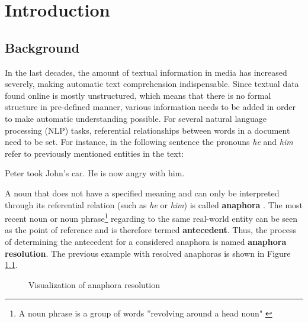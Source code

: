 \chapter{Introduction}
\label{sec:Introduction}

\section{Background}

In the last decades, the amount of textual information in media has increased severely, making automatic text comprehension indispensable. Since textual data found online is mostly unstructured, which means that there is no formal structure in pre-defined manner, various information needs to be added in order to make automatic understanding possible. For several natural language processing (NLP) tasks, referential relationships between words in a document need to be set. For instance, in the following sentence the pronouns \textit{he} and \textit{him} refer to previously mentioned entities in the text:

\begin{center}
Peter took John's car. He is now angry with him.
\end{center}

A noun that does not have a specified meaning and can only be interpreted through its referential relation (such as \textit{he} or \textit{him}) is called \textbf{anaphora} \citep{recasens2007anaphora}. The most recent noun or noun phrase\footnote{A noun phrase is a group of words ''revolving around a head noun" \citep{jurafsky2014speech}} regarding to the same real-world entity can be seen as the point of reference and is therefore termed \textbf{antecedent}. Thus, the process of determining the antecedent for a considered anaphora is named \textbf{anaphora resolution}. The previous example with resolved anaphoras is shown in Figure \ref{figure:visofanaphora}.

\begin{figure}[h]
	\centering\sffamily
	\caption{Visualization of anaphora resolution}
	\label{figure:visofanaphora}
\end{figure}

